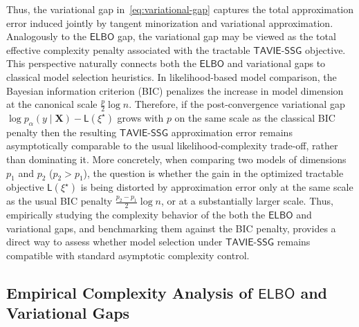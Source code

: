 \documentclass[12pt]{article}
\numberwithin{equation}{section}
\newcommand{\tssg}{\mathsf{TAVIE}\text{-}\mathsf{SSG}}
\begin{document}
Thus, the variational gap in~\eqref{eq:variational-gap} captures the total approximation error induced jointly by tangent minorization and variational approximation.
Analogously to the $\mathsf{ELBO}$ gap, the variational gap may be viewed as the total effective complexity penalty associated with the tractable $\tssg$ objective. 
This perspective naturally connects both the $\mathsf{ELBO}$ and variational gaps to classical model selection heuristics. In likelihood-based model comparison, the Bayesian information criterion (BIC) penalizes the increase in model dimension at the canonical scale $\tfrac{p}{2}\log n$. Therefore, if the post-convergence variational gap $\log p_{\alpha}(y\mid \mathbf{X}) - \mathsf{L}(\xi^\star)$ grows with $p$ on the same scale as the classical BIC penalty then the resulting $\tssg$ approximation error remains asymptotically comparable to the usual likelihood-complexity trade-off, rather than dominating it. More concretely, when comparing two models of dimensions $p_1$ and $p_2$ ($p_2 > p_1$), the question is whether the gain in the optimized tractable objective $\mathsf L(\xi^\star)$ is being distorted by approximation error only at the same scale as the usual BIC penalty $\tfrac{p_2-p_1}{2}\log n$, or at a substantially larger scale. Thus, empirically studying the complexity behavior of the both the $\mathsf{ELBO}$ and variational gaps, and benchmarking them against the BIC penalty, provides a direct way to assess whether model selection under $\tssg$ remains compatible with standard asymptotic complexity control.

\subsection{Empirical Complexity Analysis of \texorpdfstring{$\mathsf{ELBO}$}{ELBO} and Variational Gaps}\label{subsec:empirical-elbo-variational-gap}
\end{document}
